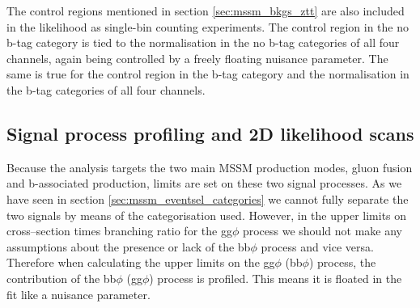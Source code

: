 The \Zmm control regions mentioned in section \ref{sec:mssm_bkgs_ztt}
are also included in the likelihood as single-bin counting experiments.
The \Zmm control region in the no b-tag category is tied
to the \Ztautau normalisation in the no b-tag categories of all four
channels, again being controlled by a freely floating nuisance parameter. 
The same is true for the \Zmm control region in the b-tag category
and the \Ztautau normalisation in the b-tag categories of all four channels.

\subsection{Signal process profiling and 2D likelihood scans}
\label{sec:mssm_sigext_profile}
Because the analysis targets the two main MSSM production modes, gluon fusion and
b-associated production, limits are set on these two signal processes. As we
have seen in section \ref{sec:mssm_eventsel_categories}  we cannot fully separate the two signals by means
of the categorisation used. 
However, in the upper limits on cross--section times branching ratio for the gg$\phi$
process we should not make any assumptions about the presence or lack of the bb$\phi$
process and vice versa. Therefore when calculating the upper limits on the gg$\phi$ (bb$\phi$)
process, the contribution of the bb$\phi$ (gg$\phi$) process is profiled. This means it is floated
in the fit like a nuisance parameter.

